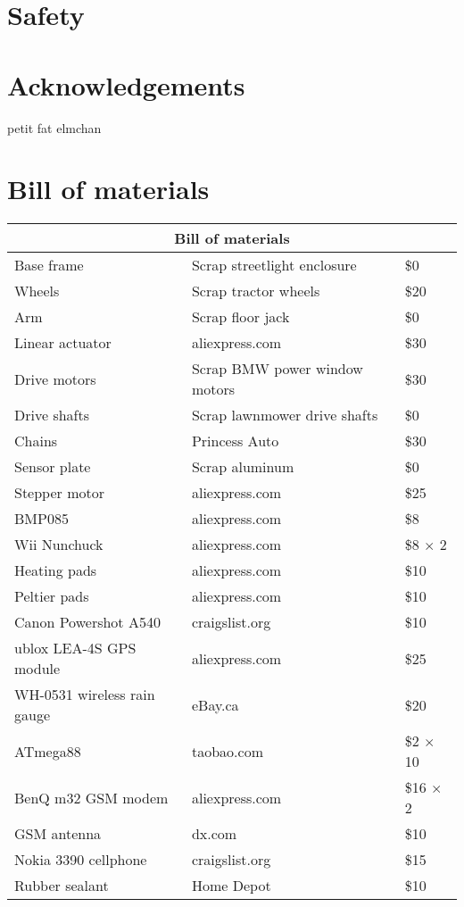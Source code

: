 \documentclass[12pt]{article}
\begin{document}
\begin{appendices}
    \section{Safety}
    \section{Acknowledgements}
petit fat elmchan
    \section{Bill of materials}
\begin{tabular}{ |l|l|l| }
  \hline
  \multicolumn{3}{|c|}{Bill of materials} \\
  \hline
  Base frame & Scrap streetlight enclosure & \$0 \\
  Wheels & Scrap tractor wheels & \$20 \\
  Arm & Scrap floor jack & \$0 \\
  Linear actuator & aliexpress.com & \$30 \\
  Drive motors & Scrap BMW power window motors & \$30 \\
  Drive shafts & Scrap lawnmower drive shafts & \$0 \\
  Chains & Princess Auto & \$30 \\
  Sensor plate & Scrap aluminum & \$0 \\
  Stepper motor & aliexpress.com & \$25 \\
  BMP085 & aliexpress.com & \$8 \\
  Wii Nunchuck & aliexpress.com & \$8 $\times$ 2 \\
  Heating pads & aliexpress.com & \$10 \\
  Peltier pads & aliexpress.com & \$10 \\
  Canon Powershot A540 & craigslist.org & \$10 \\
  ublox LEA-4S GPS module & aliexpress.com & \$25 \\
  WH-0531 wireless rain gauge & eBay.ca & \$20 \\
  ATmega88 & taobao.com & \$2 $\times$ 10 \\
  BenQ m32 GSM modem & aliexpress.com & \$16 $\times$ 2 \\
  GSM antenna & dx.com & \$10 \\
  Nokia 3390 cellphone & craigslist.org & \$15 \\
  Rubber sealant & Home Depot & \$10 \\

\end{tabular}
\end{appendices}
\end{document}
